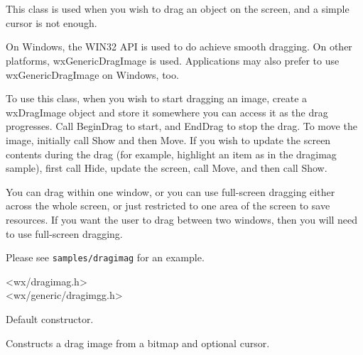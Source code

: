 \section{}\label{wxdragimage}

This class is used when you wish to drag an object on the screen,
and a simple cursor is not enough.

On Windows, the WIN32 API is used to do achieve smooth dragging. On other platforms,
wxGenericDragImage is used. Applications may also prefer to use
wxGenericDragImage on Windows, too.


To use this class, when you wish to start dragging an image, create a wxDragImage
object and store it somewhere you can access it as the drag progresses.
Call BeginDrag to start, and EndDrag to stop the drag. To move the image,
initially call Show and then Move. If you wish to update the screen contents
during the drag (for example, highlight an item as in the dragimag sample), first call Hide,
update the screen, call Move, and then call Show.

You can drag within one window, or you can use full-screen dragging
either across the whole screen, or just restricted to one area
of the screen to save resources. If you want the user to drag between
two windows, then you will need to use full-screen dragging.

Please see {\tt samples/dragimag} for an example.




<wx/dragimag.h>\\
<wx/generic/dragimgg.h>


\label{wxdragimageconstr}


Default constructor.


Constructs a drag image from a bitmap and optional cursor.


